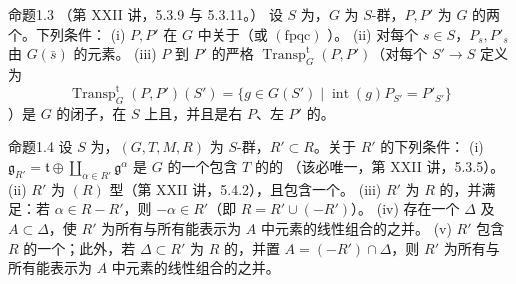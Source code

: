 \begin{SGAresult}{命题}{1.3}
（第 XXII 讲，5.3.9 与 5.3.11。）
设 $S$ 为，$G$ 为 $S$-群，$P,P'$ 为 $G$ 的两个。下列条件：
(i) $P,P'$ 在 $G$ 中关于（或 $(\mathrm{fpqc})$ ）。
(ii) 对每个 $s\in S$，$P_s,P'_s$ 由 $G(\bar s)$ 的元素。
(iii) $P$ 到 $P'$ 的严格 $\operatorname{Transp}^{\mathrm t}_G(P,P')$（对每个 $S'\to S$ 定义为
\[\operatorname{Transp}^{\mathrm t}_G(P,P')(S')=\{g\in G(S')\mid\operatorname{int}(g)P_{S'}=P'_{S'}\}\]）是 $G$ 的闭子，在 $S$ 上且，并且是右 $P$、左 $P'$ 的。
\end{SGAresult}
\begin{SGAresult}{命题}{1.4}
设 $S$ 为，$(G,T,M,R)$ 为 $S$-群，$R'\subset R$。关于 $R'$ 的下列条件：
(i) $\mathfrak g_{R'}=\mathfrak t\oplus\coprod_{\alpha\in R'}\mathfrak g^\alpha$ 是 $G$ 的一个包含 $T$ 的的 （该必唯一，第 XXII 讲，5.3.5）。
(ii) $R'$ 为 $(R)$ 型（第 XXII 讲，5.4.2），且包含一个。
(iii) $R'$ 为 $R$ 的，并满足：若 $\alpha\in R-R'$，则 $-\alpha\in R'$（即 $R=R'\cup(-R')$）。
(iv) 存在一个 $\Delta$ 及 $A\subset\Delta$，使 $R'$ 为所有与所有能表示为 $A$ 中元素的线性组合的之并。
(v) $R'$ 包含 $R$ 的一个；此外，若 $\Delta\subset R'$ 为 $R$ 的，并置 $A=(-R')\cap\Delta$，则 $R'$ 为所有与所有能表示为 $A$ 中元素的线性组合的之并。
\end{SGAresult}
